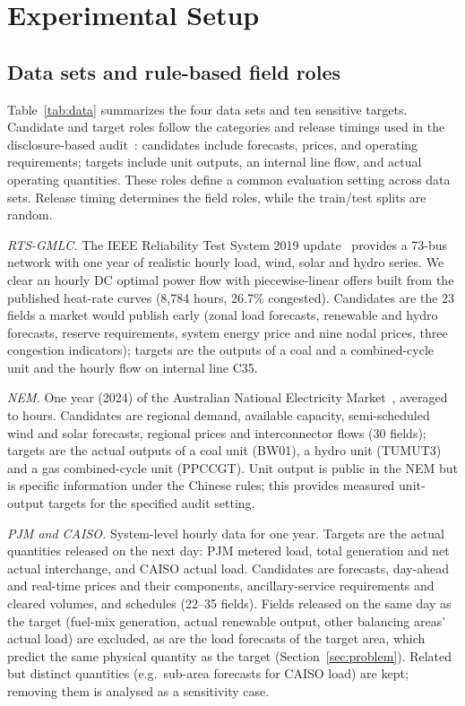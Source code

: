 \section{Experimental Setup}\label{sec:setup}

\subsection{Data sets and rule-based field roles}\label{sec:data}
Table~\ref{tab:data} summarizes the four data sets and ten sensitive targets. Candidate and target roles follow the categories and release timings used in the disclosure-based audit~\cite{nea2024disclosure}: candidates include forecasts, prices, and operating requirements; targets include unit outputs, an internal line flow, and actual operating quantities. These roles define a common evaluation setting across data sets. Release timing determines the field roles, while the train/test splits are random.

\emph{RTS-GMLC.} The IEEE Reliability Test System 2019 update~\cite{barrows2020rts} provides a
73-bus network with one year of realistic hourly load, wind, solar and hydro series. We clear
an hourly DC optimal power flow with piecewise-linear offers built from the published heat-rate
curves (8,784 hours, 26.7\% congested). Candidates are the 23 fields a market would publish
early (zonal load forecasts, renewable and hydro forecasts, reserve requirements, system energy
price and nine nodal prices, three congestion indicators); targets are the outputs of a coal and
a combined-cycle unit and the hourly flow on internal line C35.

\emph{NEM.} One year (2024) of the Australian National Electricity Market~\cite{aemo2024nemweb},
averaged to hours. Candidates are regional demand, available capacity, semi-scheduled wind and
solar forecasts, regional prices and interconnector flows (30 fields); targets are the actual
outputs of a coal unit (BW01), a hydro unit (TUMUT3) and a gas combined-cycle unit (PPCCGT).
Unit output is public in the NEM but is specific information under the Chinese rules; this provides measured unit-output targets for the specified audit setting.

\emph{PJM and CAISO.} System-level hourly data for one year. Targets are the actual quantities
released on the next day: PJM metered load, total generation and net actual interchange, and
CAISO actual load. Candidates are forecasts, day-ahead and real-time prices and their
components, ancillary-service requirements and cleared volumes, and schedules (22--35 fields).
Fields released on the same day as the target (fuel-mix generation, actual renewable output,
other balancing areas' actual load) are excluded, as are the load forecasts of the target area,
which predict the same physical quantity as the target (Section~\ref{sec:problem}). Related but distinct
quantities (e.g.\ sub-area forecasts for CAISO load) are kept; removing them is analysed as a
sensitivity case.

